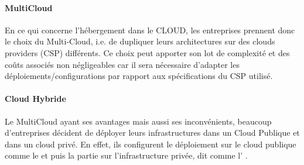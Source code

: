 \paragraph{MultiCloud}
En ce qui concerne l'hébergement dans le CLOUD, les entreprises prennent donc le choix du Multi-Cloud, i.e. de dupliquer leurs architectures sur des clouds providers (CSP) différents. Ce choix peut apporter son lot de complexité et des coûts associés non négligeables car il sera nécessaire d'adapter les déploiements/configurations par rapport aux spécifications du CSP utilisé.
\paragraph{Cloud Hybride}
Le MultiCloud ayant ses avantages mais aussi ses inconvénients, beaucoup d'entreprises décident de déployer leurs infrastructures dans un Cloud Publique et dans un cloud privé. En effet, ils configurent le déploiement sur le cloud publique comme le  et puis la partie sur l'infrastructure privée, dit  comme l' .



